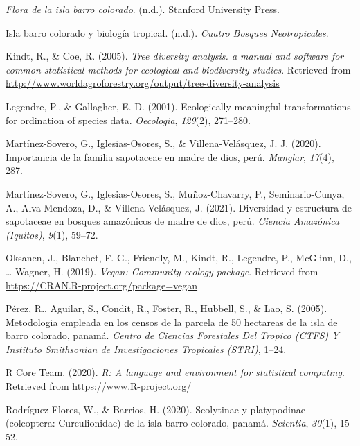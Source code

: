 \documentclass[11pt,]{article}
\begin{document}
\hypertarget{ref-croat1978flora}{}
\emph{Flora de la isla barro colorado}. (n.d.). Stanford University
Press.

\hypertarget{ref-leigh1990barro}{}
Isla barro colorado y biología tropical. (n.d.). \emph{Cuatro Bosques
Neotropicales}.

\hypertarget{ref-diversityanalysis}{}
Kindt, R., \& Coe, R. (2005). \emph{Tree diversity analysis. a manual
and software for common statistical methods for ecological and
biodiversity studies}. Retrieved from
\url{http://www.worldagroforestry.org/output/tree-diversity-analysis}

\hypertarget{ref-legendre2001ecologically}{}
Legendre, P., \& Gallagher, E. D. (2001). Ecologically meaningful
transformations for ordination of species data. \emph{Oecologia},
\emph{129}(2), 271--280.

\hypertarget{ref-martinez2020importancia}{}
Martínez-Sovero, G., Iglesias-Osores, S., \& Villena-Velásquez, J. J.
(2020). Importancia de la familia sapotaceae en madre de dios, perú.
\emph{Manglar}, \emph{17}(4), 287.

\hypertarget{ref-martinez2021diversidad}{}
Martínez-Sovero, G., Iglesias-Osores, S., Muñoz-Chavarry, P.,
Seminario-Cunya, A., Alva-Mendoza, D., \& Villena-Velásquez, J. (2021).
Diversidad y estructura de sapotaceae en bosques amazónicos de madre de
dios, perú. \emph{Ciencia Amazónica (Iquitos)}, \emph{9}(1), 59--72.

\hypertarget{ref-vegan}{}
Oksanen, J., Blanchet, F. G., Friendly, M., Kindt, R., Legendre, P.,
McGlinn, D., \ldots{} Wagner, H. (2019). \emph{Vegan: Community ecology
package}. Retrieved from \url{https://CRAN.R-project.org/package=vegan}

\hypertarget{ref-perez2005metodologia}{}
Pérez, R., Aguilar, S., Condit, R., Foster, R., Hubbell, S., \& Lao, S.
(2005). Metodologia empleada en los censos de la parcela de 50 hectareas
de la isla de barro colorado, panamá. \emph{Centro de Ciencias
Forestales Del Tropico (CTFS) Y Instituto Smithsonian de Investigaciones
Tropicales (STRI)}, 1--24.

\hypertarget{ref-Restudio}{}
R Core Team. (2020). \emph{R: A language and environment for statistical
computing}. Retrieved from \url{https://www.R-project.org/}

\hypertarget{ref-rodriguez2020scolytinae}{}
Rodríguez-Flores, W., \& Barrios, H. (2020). Scolytinae y platypodinae
(coleoptera: Curculionidae) de la isla barro colorado, panamá.
\emph{Scientia}, \emph{30}(1), 15--52.
\end{document}
